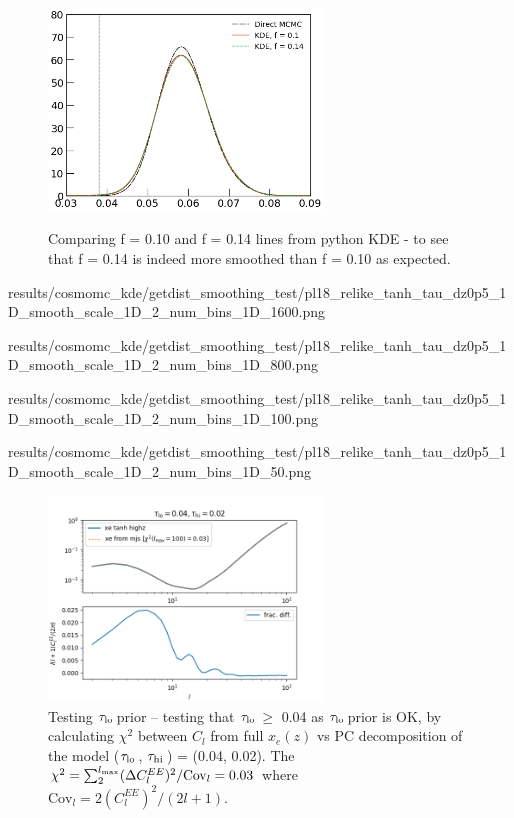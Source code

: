 \documentclass[prd,amsmath,amssymb,floatfix,superscriptaddress,nofootinbib]{revtex4-1}
\newcommand{\tauhi}{$\tau_{\rm hi}\,$}
\newcommand{\taulo}{$\tau_{\rm lo}\,$}
\begin{document}
\begin{figure}
\includegraphics[width=0.65\textwidth]{cosmomc_kde/getdist_smoothing_test/pl18_pc_zmax30_pliklite_srollv2_1015_tau_posterior_python_kde_f_0p1_vs_0p14.png}
\label{fig:}
\caption{Comparing f = 0.10 and f = 0.14 lines from python KDE - to see that f = 0.14 is indeed more smoothed than f = 0.10 as expected.
} 
\end{figure}


results/cosmomc_kde/getdist_smoothing_test/pl18_relike_tanh_tau_dz0p5_1D_smooth_scale_1D_2_num_bins_1D_1600.png

results/cosmomc_kde/getdist_smoothing_test/pl18_relike_tanh_tau_dz0p5_1D_smooth_scale_1D_2_num_bins_1D_800.png

results/cosmomc_kde/getdist_smoothing_test/pl18_relike_tanh_tau_dz0p5_1D_smooth_scale_1D_2_num_bins_1D_100.png

results/cosmomc_kde/getdist_smoothing_test/pl18_relike_tanh_tau_dz0p5_1D_smooth_scale_1D_2_num_bins_1D_50.png

\begin{figure}
\includegraphics[width=0.65\textwidth]{cosmomc_kde/taulo_prior_test/plot_cls_taulo_0p04_tauhi_0p02.png}
\caption{Testing \taulo prior -- testing that \taulo $\geq$ 0.04 as \taulo prior is OK, by calculating $\chi^2$ between $C_l$ from full $x_e(z)$ vs PC decomposition of the model (\taulo, \tauhi) = (0.04, 0.02). The $\chi^2 = \sum_{2}^{l_{\rm max}} (\Delta C_l^{EE})^2 / \mathrm{Cov}_l = 0.03$ where $\mathrm{Cov}_l = 2 (C_l^{EE})^2/(2l+1)$. 
} 
\label{fig:taulo_prior_test_cl}
\end{figure}
\end{document}
